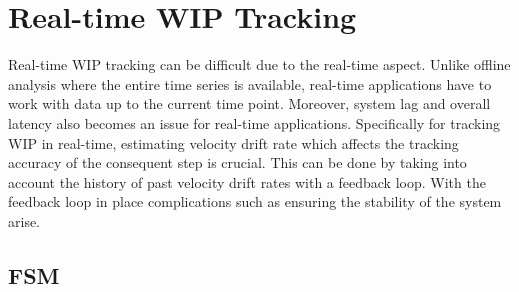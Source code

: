
\section{Real-time WIP Tracking}

Real-time WIP tracking can be difficult due to the real-time aspect. Unlike offline analysis where the entire time series is available, real-time applications have to work with data up to the current time point. Moreover, system lag and overall latency also becomes an issue for real-time applications. Specifically for tracking WIP in real-time, estimating velocity drift rate which affects the tracking accuracy of the consequent step is crucial. This can be done by taking into account the history of past velocity drift rates with a feedback loop. With the feedback loop in place complications such as ensuring the stability of the system arise.

\subsection{FSM}

